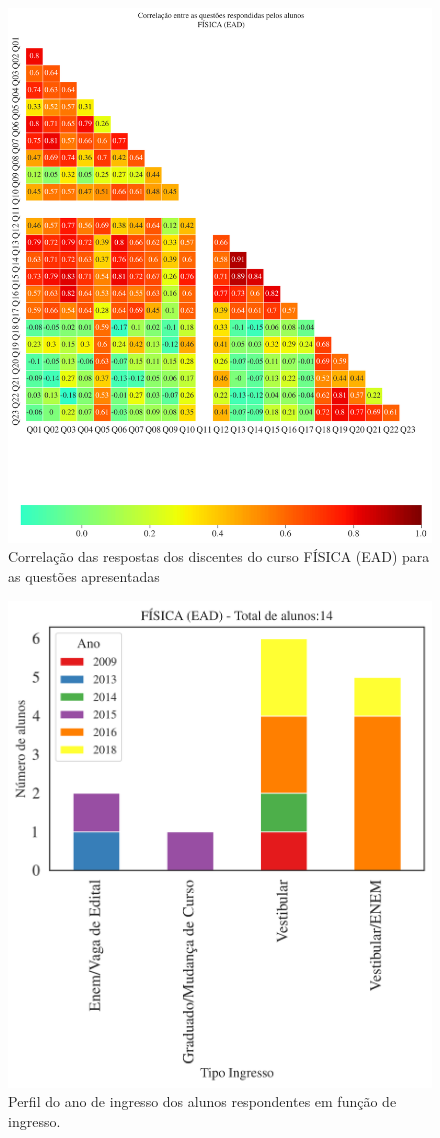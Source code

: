 \documentclass[a4paper,10pt]{article}
\begin{document}
\begin{figure}[h]
\centering
\includegraphics[width=0.999\linewidth]{matriz_corr__113527.png}
\caption{\label{fig:corr_alunos}Correlação das respostas dos discentes do curso FÍSICA (EAD) para as questões apresentadas}
\end{figure}
\begin{figure}[h]
\centering
\includegraphics[width=0.7\linewidth]{ingresso_discentes_curso_ano_113527.png}
\caption{\label{fig:ingresso_ano} Perfil do ano de ingresso dos alunos respondentes em função de ingresso.}
\end{figure}
\end{document}
